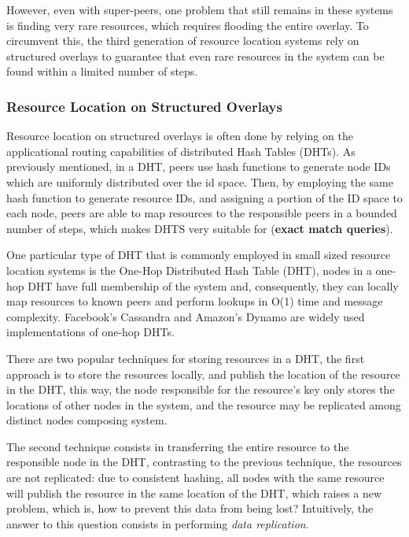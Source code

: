 However, even with super-peers, one problem that still remains in these systems is finding very rare resources, which requires flooding the entire overlay. To circumvent this, the third generation of resource location systems rely on structured overlays to guarantee that even rare resources in the system can be found within a limited number of steps.

\subsubsection{Resource Location on Structured Overlays}

Resource location on structured overlays is often done by relying on the applicational routing capabilities of distributed Hash Tables (DHTs). As previously mentioned, in a DHT, peers use hash functions to generate node IDs which are uniformly distributed over the id space. Then, by employing the same hash function to generate resource IDs, and assigning a portion of the ID space to each node, peers are able to map resources to the responsible peers in a bounded number of steps, which makes DHTS very suitable for (\textbf{exact match queries}). 

One particular type of DHT that is commonly employed in small sized resource location systems is the One-Hop Distributed Hash Table (DHT), nodes in a one-hop DHT have full membership of the system and, consequently, they can locally map resources to known peers and perform lookups in O(1) time and message complexity. Facebook's Cassandra \cite{lakshman2010cassandra} and Amazon's Dynamo \cite{decandia2007dynamo} are widely used implementations of one-hop DHTs. 

There are two popular techniques for storing resources in a DHT, the first approach is to store the resources locally, and publish the location of the resource in the DHT, this way, the node responsible for the resource's key only stores the locations of other nodes in the system, and the resource may be replicated among distinct nodes composing system. 

The second technique consists in transferring the entire resource to the responsible node in the DHT, contrasting to the previous technique, the resources are not replicated: due to consistent hashing, all nodes with the same resource will publish the resource in the same location of the DHT, which raises a new problem, which is, how to prevent this data from being lost? Intuitively, the answer to this question consists in performing \textit{data replication}.

